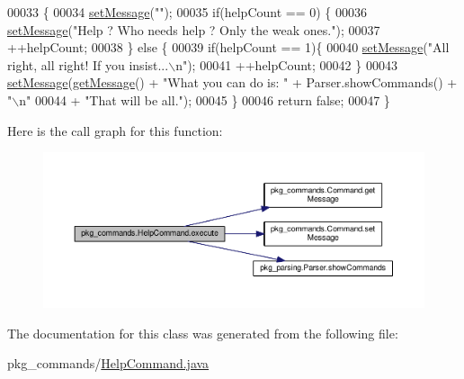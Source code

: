 \begin{DoxyCode}
00033                                           \{
00034         \hyperlink{classpkg__commands_1_1Command_ae210ff216fe908b111ba1c988a963d13}{setMessage}(\textcolor{stringliteral}{""});
00035         \textcolor{keywordflow}{if}(helpCount == 0) \{
00036             \hyperlink{classpkg__commands_1_1Command_ae210ff216fe908b111ba1c988a963d13}{setMessage}(\textcolor{stringliteral}{"Help ? Who needs help ? Only the weak ones."});
00037             ++helpCount;
00038         \} \textcolor{keywordflow}{else} \{
00039             \textcolor{keywordflow}{if}(helpCount == 1)\{
00040                 \hyperlink{classpkg__commands_1_1Command_ae210ff216fe908b111ba1c988a963d13}{setMessage}(\textcolor{stringliteral}{"All right, all right! If you insist...\(\backslash\)n"});
00041                 ++helpCount;
00042             \}
00043             \hyperlink{classpkg__commands_1_1Command_ae210ff216fe908b111ba1c988a963d13}{setMessage}(\hyperlink{classpkg__commands_1_1Command_ac2a42e2bab264821892daefaf9a18b6c}{getMessage}() + \textcolor{stringliteral}{"What you can do is: "} + Parser.showCommands() + \textcolor{stringliteral}{
      "\(\backslash\)n"}
00044                     + \textcolor{stringliteral}{"That will be all."});
00045         \}
00046         \textcolor{keywordflow}{return} \textcolor{keyword}{false};
00047     \}
\end{DoxyCode}


Here is the call graph for this function\-:
\nopagebreak
\begin{figure}[H]
\begin{center}
\leavevmode
\includegraphics[width=350pt]{classpkg__commands_1_1HelpCommand_a332d3e57539dfc82f8c539f8b3e24dd6_cgraph}
\end{center}
\end{figure}




The documentation for this class was generated from the following file\-:\begin{DoxyCompactItemize}
\item 
pkg\-\_\-commands/\hyperlink{HelpCommand_8java}{Help\-Command.\-java}\end{DoxyCompactItemize}
